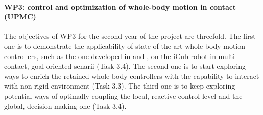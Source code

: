 \paragraph{WP3: control and optimization of whole-body motion in contact (UPMC)}

The objectives of WP3 for the second year of the project are threefold. The first one is to demonstrate the applicability of state of the art whole-body motion controllers, such as the one developed in \cite{salini2012} and \cite{delprete2013}, on the iCub robot in multi-contact, goal oriented senarii (Task 3.4). The second one is to start exploring ways to enrich the retained whole-body controllers with the capability to interact with non-rigid environment (Task 3.3). The third one is to keep exploring potential ways of optimally coupling the local, reactive control level and the global, decision making one (Task 3.4).
